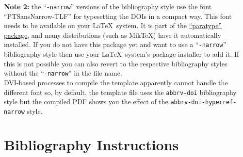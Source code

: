 \documentclass{vgtc}                          %
\begin{document}
\begin{itemize}
\textbf{Note 2:} the ``\texttt{-narrow}'' versions of the bibliography style use the font ``PTSansNarrow-TLF'' for typesetting the DOIs in a compact way. This font needs to be available on your \LaTeX\ system. It is part of the \href{https://www.ctan.org/pkg/paratype}{``paratype'' package}, and many distributions (such as MikTeX) have it automatically installed. If you do not have this package yet and want to use a ``\texttt{-narrow}'' bibliography style then use your \LaTeX\ system's package installer to add it. If this is not possible you can also revert to the respective bibliography styles without the ``\texttt{-narrow}'' in the file name.\\[1em]
DVI-based processes to compile the template apparently cannot handle the different font so, by default, the template file uses the \texttt{abbrv-doi} bibliography style but the compiled PDF shows you the effect of the \texttt{abbrv-doi-hyperref-narrow} style.
\end{itemize}

\section{Bibliography Instructions}
\end{document}
